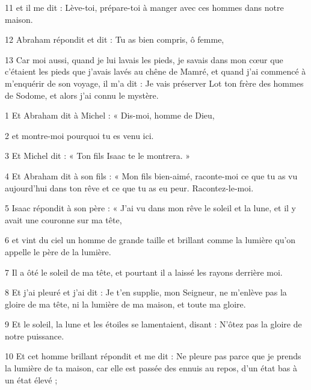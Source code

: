 \par 11 et il me dit : Lève-toi, prépare-toi à manger avec ces hommes dans notre maison.

\par 12 Abraham répondit et dit : Tu as bien compris, ô femme,

\par 13 Car moi aussi, quand je lui lavais les pieds, je savais dans mon cœur que c'étaient les pieds que j'avais lavés au chêne de Mamré, et quand j'ai commencé à m'enquérir de son voyage, il m'a dit : Je vais préserver Lot ton frère des hommes de Sodome, et alors j'ai connu le mystère.



\par 1 Et Abraham dit à Michel : « Dis-moi, homme de Dieu,

\par 2 et montre-moi pourquoi tu es venu ici.

\par 3 Et Michel dit : « Ton fils Isaac te le montrera. »

\par 4 Et Abraham dit à son fils : « Mon fils bien-aimé, raconte-moi ce que tu as vu aujourd'hui dans ton rêve et ce que tu as eu peur. Racontez-le-moi.

\par 5 Isaac répondit à son père : « J'ai vu dans mon rêve le soleil et la lune, et il y avait une couronne sur ma tête,

\par 6 et vint du ciel un homme de grande taille et brillant comme la lumière qu'on appelle le père de la lumière.

\par 7 Il a ôté le soleil de ma tête, et pourtant il a laissé les rayons derrière moi.

\par 8 Et j'ai pleuré et j'ai dit : Je t'en supplie, mon Seigneur, ne m'enlève pas la gloire de ma tête, ni la lumière de ma maison, et toute ma gloire.

\par 9 Et le soleil, la lune et les étoiles se lamentaient, disant : N'ôtez pas la gloire de notre puissance.

\par 10 Et cet homme brillant répondit et me dit : Ne pleure pas parce que je prends la lumière de ta maison, car elle est passée des ennuis au repos, d'un état bas à un état élevé ;

